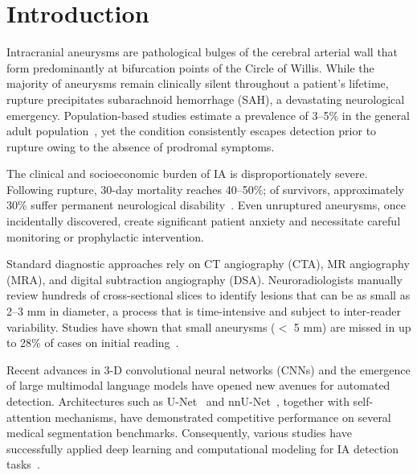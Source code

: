 \documentclass[journal]{IEEEtran}
\begin{document}
\section{Introduction}
\label{sec:intro}

Intracranial aneurysms are pathological bulges of the cerebral arterial wall
that form predominantly at bifurcation points of the Circle of Willis.
While the majority of aneurysms remain clinically silent throughout a patient's
lifetime, rupture precipitates subarachnoid hemorrhage (SAH), a devastating
neurological emergency. Population-based studies estimate a prevalence of
3--5\% in the general adult population~\cite{rinkel1998prevalence}, yet the
condition consistently escapes detection prior to rupture owing to the absence
of prodromal symptoms.

The clinical and socioeconomic burden of IA is disproportionately severe.
Following rupture, 30-day mortality reaches 40--50\%; of survivors,
approximately 30\% suffer permanent neurological disability~\cite{feigin2009}.
Even unruptured aneurysms, once incidentally discovered, create significant
patient anxiety and necessitate careful monitoring or prophylactic intervention.

Standard diagnostic approaches rely on CT angiography (CTA), MR angiography
(MRA), and digital subtraction angiography (DSA). Neuroradiologists manually
review hundreds of cross-sectional slices to identify lesions that can be
as small as 2--3 mm in diameter, a process that is time-intensive and
subject to inter-reader variability. Studies have shown that small aneurysms
($<$ 5 mm) are missed in up to 28\% of cases on initial reading~\cite{white2001}.

Recent advances in 3-D convolutional neural networks (CNNs) and the emergence
of large multimodal language models have opened new avenues for automated
detection. Architectures such as U-Net~\cite{unet2015} and nnU-Net~\cite{nnunet2021},
together with self-attention mechanisms, have demonstrated competitive
performance on several medical segmentation benchmarks. Consequently, various studies
have successfully applied deep learning and computational modeling for
IA detection tasks~\cite{yang2021, lauric2010, ueda2019, bizjak2023}.
\end{document}
